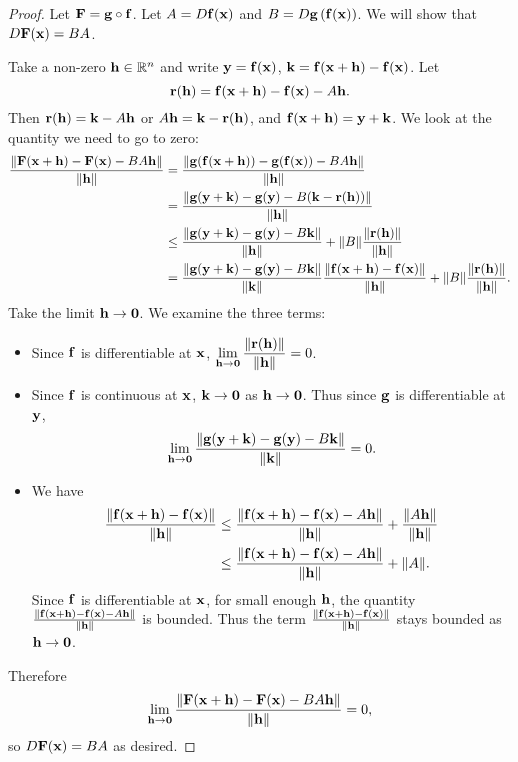 \begin{proof}
Let $\vb{F}=\vb{g}\circ\vb{f}$. 
Let $A=D\vb{f}(\vb{x})$ and $B=D\vb{g}\left(\vb{f}(\vb{x})\right)$. 
We will show that $D\vb{F}(\vb{x})=BA$.

Take a non-zero $\vb{h}\in\mathbb R^n$ and write $\vb{y}=\vb{f}(\vb{x})$, $\vb{k}=\vb{f}(\vb{x}+\vb{h})-\vb{f}(\vb{x})$. Let
\[\vb{r}(\vb{h})=\vb{f}(\vb{x}+\vb{h})-\vb{f}(\vb{x})-A\vb{h}.\]
Then $\vb{r}(\vb{h})=\vb{k}-A\vb{h}$ or $A\vb{h}=\vb{k}-\vb{r}(\vb{h})$, and $\vb{f}(\vb{x}+\vb{h})=\vb{y}+\vb{k}$. 
We look at the quantity we need to go to zero:
\begin{align*}
\frac{\norm{\vb{F}(\vb{x}+\vb{h})-\vb{F}(\vb{x})-BA\vb{h}}}{\norm{\vb{h}}}
&=\frac{\norm{\vb{g}(\vb{f}(\vb{x}+\vb{h}))-\vb{g}(\vb{f}(\vb{x}))-BA\vb{h}}}{\norm{\vb{h}}}\\
&=\frac{\norm{\vb{g}(\vb{y}+\vb{k})-\vb{g}(\vb{y})-B(\vb{k}-\vb{r}(\vb{h}))}}{\norm{\vb{h}}}\\
&\le\frac{\norm{\vb{g}(\vb{y}+\vb{k})-\vb{g}(\vb{y})-B\vb{k}}}{\norm{\vb{h}}}+\norm{B}\frac{\norm{\vb{r}(\vb{h})}}{\norm{\vb{h}}}\\
&=\frac{\norm{\vb{g}(\vb{y}+\vb{k})-\vb{g}(\vb{y})-B\vb{k}}}{\norm{\vb{k}}}\frac{\norm{\vb{f}(\vb{x}+\vb{h})-\vb{f}(\vb{x})}}{\norm{\vb{h}}}+\norm{B}\frac{\norm{\vb{r}(\vb{h})}}{\norm{\vb{h}}}.
\end{align*}
Take the limit $\vb{h}\to\vb{0}$. 
We examine the three terms:
\begin{itemize}
\item Since $\vb{f}$ is differentiable at $\vb{x}$, $\displaystyle\lim_{\vb{h}\to\vb{0}}\frac{\norm{\vb{r}(\vb{h})}}{\norm{\vb{h}}}=0$.
\item Since $\vb{f}$ is continuous at $\vb{x}$, $\vb{k}\to\vb{0}$ as $\vb{h}\to\vb{0}$. Thus since $\vb{g}$ is differentiable at $\vb{y}$,
\[\lim_{\vb{h}\to\vb{0}}\frac{\norm{\vb{g}(\vb{y}+\vb{k})-\vb{g}(\vb{y})-B\vb{k}}}{\norm{\vb{k}}}=0.\]
\item We have
\begin{align*}
\frac{\norm{\vb{f}(\vb{x}+\vb{h})-\vb{f}(\vb{x})}}{\norm{\vb{h}}}
&\le\frac{\norm{\vb{f}(\vb{x}+\vb{h})-\vb{f}(\vb{x})-A\vb{h}}}{\norm{\vb{h}}}+\frac{\norm{A\vb{h}}}{\norm{\vb{h}}}\\
&\le\frac{\norm{\vb{f}(\vb{x}+\vb{h})-\vb{f}(\vb{x})-A\vb{h}}}{\norm{\vb{h}}}+\norm{A}.
\end{align*}
Since $\vb{f}$ is differentiable at $\vb{x}$, for small enough $\vb{h}$, the quantity $\frac{\norm{\vb{f}(\vb{x}+\vb{h})-\vb{f}(\vb{x})-A\vb{h}}}{\norm{\vb{h}}}$ is bounded. 
Thus the term $\frac{\norm{\vb{f}(\vb{x}+\vb{h})-\vb{f}(\vb{x})}}{\norm{\vb{h}}}$ stays bounded as $\vb{h}\to\vb{0}$.
\end{itemize}
Therefore
\[\lim_{\vb{h}\to\vb{0}}\frac{\norm{\vb{F}(\vb{x}+\vb{h})-\vb{F}(\vb{x})-BA\vb{h}}}{\norm{\vb{h}}}=0,\]
so $D\vb{F}(\vb{x})=BA$ as desired.
\end{proof}

